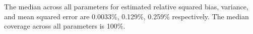 The median across all parameters for  estimated relative squared bias, variance, and mean squared error are 0.0033\%, 0.129\%, 0.259\% respectively. The median coverage across all parameters is 100\%.